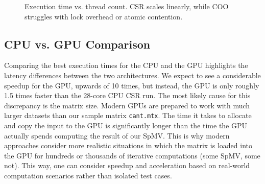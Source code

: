 \documentclass[11pt, letterpaper]{article}
\begin{document}
\begin{figure}[ht]
    \centering
    \caption{Execution time vs. thread count. CSR scales linearly, while COO struggles with lock overhead or atomic contention.}
    \label{fig:scaling}
\end{figure}


\subsection{CPU vs. GPU Comparison}
Comparing the best execution times for the CPU and the GPU highlights the latency differences between the two architectures. We expect to see a considerable speedup for the GPU, upwards of 10 times, but instead, the GPU is only roughly 1.5 times faster than the 28-core CPU CSR run. The most likely cause for this discrepancy is the matrix size. Modern GPUs are prepared to work with much larger datasets than our sample matrix \texttt{cant.mtx}. The time it takes to allocate and copy the input to the GPU is significantly longer than the time the GPU actually spends computing the result of our SpMV. This is why modern approaches consider more realistic situations in which the matrix is loaded into the GPU for hundreds or thousands of iterative computations (some SpMV, some not). This way, one can consider speedup and acceleration based on real-world computation scenarios rather than isolated test cases.
\end{document}
